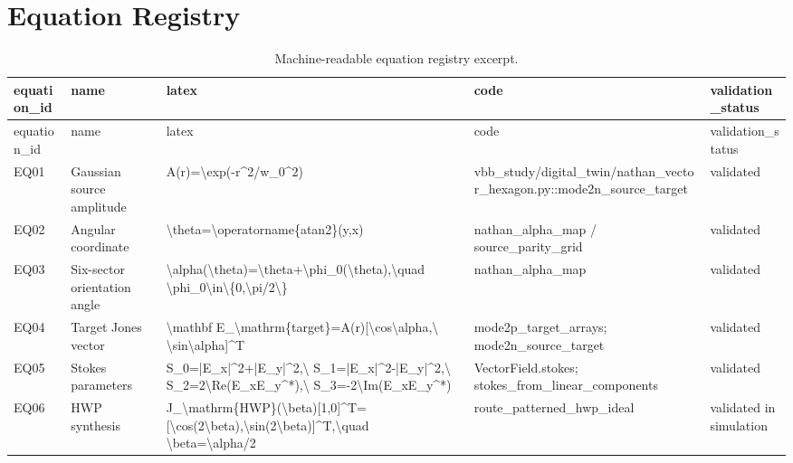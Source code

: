 \documentclass[11pt,a4paper]{report}
\begin{document}
\chapter{Equation Registry}

\begin{longtable}{p{}p{}p{}p{}p{}}
\caption{Machine-readable equation registry excerpt.}\label{tab:eq-registry}\\
\toprule
equation\_id & name & latex & code & validation\_status\\
\midrule
\endfirsthead
\toprule
equation\_id & name & latex & code & validation\_status\\
\midrule
\endhead
EQ01 & Gaussian source amplitude & A(r)=\textbackslash{}exp(-r\textasciicircum{}2/w\_0\textasciicircum{}2) & vbb\_study/digital\_twin/nathan\_vector\_hexagon.py::mode2n\_source\_target & validated\\
EQ02 & Angular coordinate & \textbackslash{}theta=\textbackslash{}operatorname\{atan2\}(y,x) & nathan\_alpha\_map / source\_parity\_grid & validated\\
EQ03 & Six-sector orientation angle & \textbackslash{}alpha(\textbackslash{}theta)=\textbackslash{}theta+\textbackslash{}phi\_0(\textbackslash{}theta),\textbackslash{}quad \textbackslash{}phi\_0\textbackslash{}in\textbackslash{}\{0,\textbackslash{}pi/2\textbackslash{}\} & nathan\_alpha\_map & validated\\
EQ04 & Target Jones vector & \textbackslash{}mathbf E\_\textbackslash{}mathrm\{target\}=A(r)[\textbackslash{}cos\textbackslash{}alpha,\textbackslash{} \textbackslash{}sin\textbackslash{}alpha]\textasciicircum{}T & mode2p\_target\_arrays; mode2n\_source\_target & validated\\
EQ05 & Stokes parameters & S\_0=|E\_x|\textasciicircum{}2+|E\_y|\textasciicircum{}2,\textbackslash{} S\_1=|E\_x|\textasciicircum{}2-|E\_y|\textasciicircum{}2,\textbackslash{} S\_2=2\textbackslash{}Re(E\_xE\_y\textasciicircum{}*),\textbackslash{} S\_3=-2\textbackslash{}Im(E\_xE\_y\textasciicircum{}*) & VectorField.stokes; stokes\_from\_linear\_components & validated\\
EQ06 & HWP synthesis & J\_\textbackslash{}mathrm\{HWP\}(\textbackslash{}beta)[1,0]\textasciicircum{}T=[\textbackslash{}cos(2\textbackslash{}beta),\textbackslash{}sin(2\textbackslash{}beta)]\textasciicircum{}T,\textbackslash{}quad \textbackslash{}beta=\textbackslash{}alpha/2 & route\_patterned\_hwp\_ideal & validated in simulation\\

\end{longtable}
\end{document}
